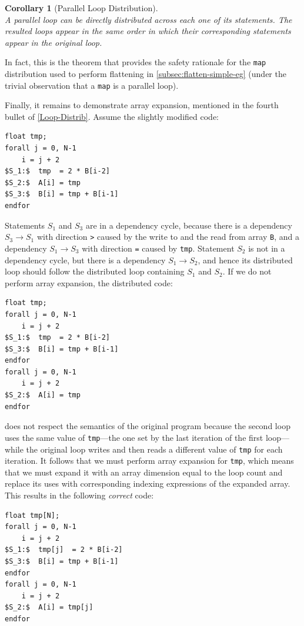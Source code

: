 \documentclass[acmsmall,review]{acmart}\settopmatter{printfolios=true,printccs=false,printacmref=false}
\newtheorem{mycorol}{Corollary}
\begin{document}
\begin{mycorol}[Parallel Loop Distribution]\label{Par-Loop-Distr}
$\mbox{ }$\\
A parallel loop can be directly distributed across each one of
its statements. The resulted loops appear in the same order in 
which their corresponding statements appear in the original loop.
\end{mycorol}

In fact, this is the theorem that provides the safety rationale
for the \lstinline{map} distribution used to perform flattening
in  \cref{subsec:flatten-simple-eg} (under the trivial observation
that a \lstinline{map} is a parallel loop).

Finally, it remains to demonstrate array expansion, mentioned
in the fourth bullet of \cref{Loop-Distrib}. Assume the slightly
modified code:
\begin{lstlisting}[mathescape=true]
float tmp;
forall j = 0, N-1
    i = j + 2
$S_1:$  tmp  = 2 * B[i-2]
$S_2:$  A[i] = tmp
$S_3:$  B[i] = tmp + B[i-1]
endfor
\end{lstlisting}\vspace{-2ex}
Statements $S_1$ and $S_3$ are in a dependency cycle, because
there is a dependency $S_3\to S_1$ with direction {\tt>} caused
by the write to and the read from array {\tt B}, and a dependency 
$S_1\to S_3$ with direction {\tt=} caused by {\tt tmp}.
Statement $S_2$ is not in a dependency cycle, but there is a
dependency $S_1\to S_2$, and hence its distributed loop
should follow the distributed loop containing $S_1$ and $S_2$. 
If we do not perform array expansion, the distributed code:
\begin{lstlisting}[mathescape=true]
float tmp;
forall j = 0, N-1
    i = j + 2
$S_1:$  tmp  = 2 * B[i-2]
$S_3:$  B[i] = tmp + B[i-1]
endfor
forall j = 0, N-1
    i = j + 2
$S_2:$  A[i] = tmp
endfor
\end{lstlisting}\vspace{-2ex}
\noindent does not respect the semantics of the original program
because the second loop uses the same value of {\tt tmp}---the one
set by the last iteration of the first loop---while the original
loop writes and then reads a different value of {\tt tmp} for 
each iteration. It follows that we must perform array expansion
for {\tt tmp}, which means that we must expand it with an array 
dimension equal to the loop count and replace its uses with
corresponding indexing expressions of the expanded array. 
This results in the following {\em correct} code:
\begin{lstlisting}[mathescape=true]
float tmp[N];
forall j = 0, N-1
    i = j + 2
$S_1:$  tmp[j]  = 2 * B[i-2]
$S_3:$  B[i] = tmp + B[i-1]
endfor
forall j = 0, N-1
    i = j + 2
$S_2:$  A[i] = tmp[j]
endfor
\end{lstlisting}\vspace{-2ex}
\end{document}
